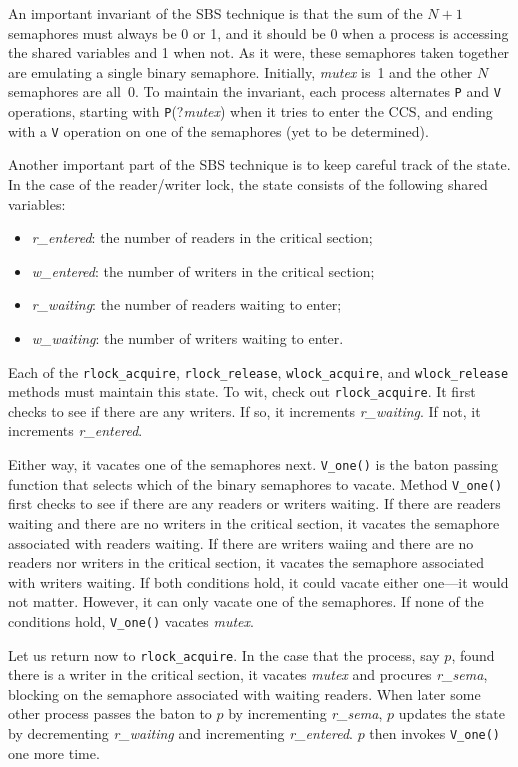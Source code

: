 \documentclass{report}
\begin{document}
An important invariant of the SBS technique is that the sum of the $N+1$ semaphores
must always be 0 or 1, and it should be 0 when a process is accessing the shared
variables and 1 when not.
As it were, these semaphores taken together are emulating a single binary semaphore.
Initially, \textit{mutex} is~1 and the other $N$ semaphores
are all~0.  To maintain the invariant, each process alternates \texttt{P} and
\texttt{V} operations, starting with \texttt{P}(?\textit{mutex}) when it tries to
enter the CCS, and ending with a \texttt{V} operation on one of the semaphores
(yet to be determined).

Another important part of the SBS technique is to keep careful track of the
state.  In the case of the reader/writer lock, the state consists of the
following shared variables:
\begin{itemize}
\item \textit{r\_entered}: the number of readers in the critical section;
\item \textit{w\_entered}: the number of writers in the critical section;
\item \textit{r\_waiting}: the number of readers waiting to enter;
\item \textit{w\_waiting}: the number of writers waiting to enter.
\end{itemize}
Each of the
\texttt{rlock\_acquire}, \texttt{rlock\_release},
\texttt{wlock\_acquire}, and \texttt{wlock\_release} methods must maintain
this state.
To wit, check out \texttt{rlock\_acquire}.  It first checks to see if there
are any writers.  If so, it increments \textit{r\_waiting}.  If not,
it increments \textit{r\_entered}.

Either way, it vacates one of the semaphores next.
\texttt{V\_one()} is the baton passing function that selects which of the
binary semaphores to vacate.
Method \texttt{V\_one()} first checks to see if there are any readers or
writers waiting.  If there are readers waiting and there are no writers
in the critical section, it vacates the semaphore associated with
readers waiting.  If there are writers waiing and there are no readers
nor writers in the critical section, it vacates the semaphore associated
with writers waiting.  If both conditions hold, it could vacate either
one---it would not matter.  However, it can only vacate one of the semaphores.
If none of the conditions hold, \texttt{V\_one()} vacates \textit{mutex}.

Let us return now to \texttt{rlock\_acquire}. In the case that the process,
say $p$,
found there is a writer in the critical section, it vacates
\textit{mutex} and procures \textit{r\_sema},
blocking on the semaphore associated
with waiting readers.  When later some other process passes the baton to
$p$ by incrementing \textit{r\_sema}, $p$ updates the state by decrementing
\textit{r\_waiting} and incrementing \textit{r\_entered}.  $p$
then invokes \texttt{V\_one()} one more time.
\end{document}
